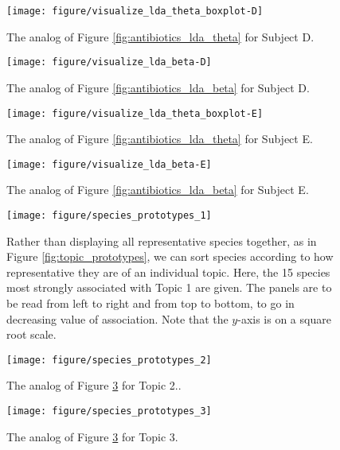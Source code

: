 \documentclass{article}
\begin{document}
\begin{figure}[!p]
  \centering\texttt{[image: figure/visualize\_lda\_theta\_boxplot-D]}
  \caption{The analog of Figure \ref{fig:antibiotics_lda_theta} for Subject
    D. \label{fig:antibiotics_lda_theta_D}}
\end{figure}

\begin{figure}[!p]
  \centering\texttt{[image: figure/visualize\_lda\_beta-D]}
  \caption{The analog of Figure \ref{fig:antibiotics_lda_beta} for Subject D.}
\end{figure}

\begin{figure}[!p]
  \centering\texttt{[image: figure/visualize\_lda\_theta\_boxplot-E]}
  \caption{The analog of Figure \ref{fig:antibiotics_lda_theta} for Subject E.}
\end{figure}

\begin{figure}[!p]
  \centering\texttt{[image: figure/visualize\_lda\_beta-E]}
  \caption{The analog of Figure \ref{fig:antibiotics_lda_beta} for Subject E. \label{fig:antibiotics_lda_beta_E}}
\end{figure}

\begin{figure}[!p]
  \centering
  \texttt{[image: figure/species\_prototypes\_1]}
  \caption{Rather than displaying all representative species together, as in
    Figure \ref{fig:topic_prototypes}, we can sort species according to how
    representative they are of an individual topic. Here, the 15 species most
    strongly associated with Topic 1 are given. The panels are to be read from
    left to right and from top to bottom, to go in decreasing value of
    association. Note that the $y$-axis is on a square root
    scale. \label{fig:species_prototypes_1} }
\end{figure}

\begin{figure}[!p]
  \centering
  \texttt{[image: figure/species\_prototypes\_2]}
  \caption{The analog of Figure \ref{fig:species_prototypes_1} for Topic
    2.\label{fig:species_prototypes_2}. }
\end{figure}

\begin{figure}[!p]
  \centering
  \texttt{[image: figure/species\_prototypes\_3]}
  \caption{The analog of Figure \ref{fig:species_prototypes_1} for Topic
    3. \label{fig:species_prototypes_3} }
\end{figure}
\end{document}

